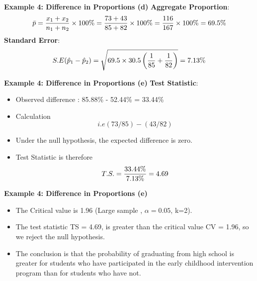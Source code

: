 \documentclass[a4]{beamer}
\begin{document}





\noindent \textbf{Example 4: Difference in Proportions (d)}
\textbf{Aggregate Proportion}:\\
\[ \bar{p}  = {x_1  + x_2 \over n_1 + n_2} \times 100\% = {73+43 \over 85 + 82} \times 100\% = { 116 \over 167}\times 100\% = 69.5\% \]
\textbf{Standard Error}:\\
\[ S.E (\hat{p}_1 - \hat{p}_2)  =  \sqrt{69.5 \times 30.5  \left( {1 \over 85} + {1 \over 82}  \right)}  = 7.13\% \]






\noindent \textbf{Example 4: Difference in Proportions (e)}
\textbf{Test Statistic}:
\begin{itemize} \item Observed difference :
85.88\% - 52.44\%  = 33.44\% \item Calculation \[ i.e (73/85) - (43 /82) \]
\item Under the null hypothesis, the expected difference is zero.
\item Test Statistic is therefore \[T.S. = {33.44\% \over 7.13\%} = 4.69\]
\end{itemize}



\noindent \textbf{Example 4: Difference in Proportions (e)}
\begin{itemize}
\item The Critical value is 1.96 (Large sample , $\alpha = 0.05$, k=2).

\item The test statistic TS = 4.69, is greater than the critical value CV = 1.96, so we reject the null hypothesis.
\item The conclusion is that the probability of graduating from high school is greater for students who have participated in the early childhood intervention program than for students who have not.
\end{itemize}
\end{document}
